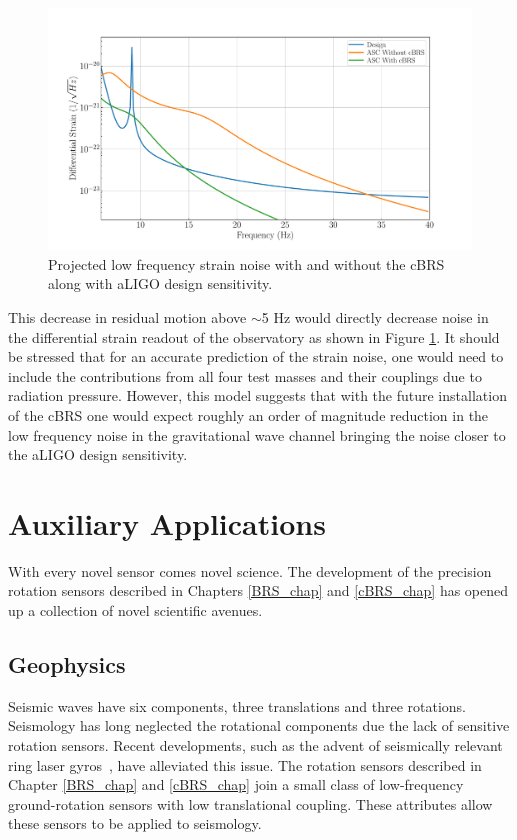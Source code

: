 \documentclass [12pt, proquest]{uwthesis}[2019]
\begin{document}
\begin{figure}[!h]
\begin{center}
\includegraphics[width=\textwidth]{cBRS_ASC.pdf}
\caption[Projected low frequency strain noise with and without the cBRS]{Projected low frequency strain noise with and without the cBRS along with aLIGO design sensitivity. \cite{aLIGO} }
\label{ascStrain}
\end{center}
\end{figure}

This decrease in residual motion above $\sim$5 Hz would directly decrease noise in the differential strain readout of the observatory as shown in Figure \ref{ascStrain}. It should be stressed that for an accurate prediction of the strain noise, one would need to include the contributions from all four test masses and their couplings due to radiation pressure. However, this model suggests that with the future installation of the cBRS one would expect roughly an order of magnitude reduction in the low frequency noise in the gravitational wave channel bringing the noise closer to the aLIGO design sensitivity.


\chapter{Auxiliary Applications}
\quad With every novel sensor comes novel science. The development of the precision rotation sensors described in Chapters \ref{BRS_chap} and \ref{cBRS_chap} has opened up a collection of novel scientific avenues.

\section{Geophysics}
Seismic waves have six components, three translations and three rotations. Seismology has long neglected the rotational components due the lack of sensitive rotation sensors. Recent developments, such as the advent of seismically relevant ring laser gyros~\cite{ring}, have alleviated this issue. The rotation sensors described in Chapter \ref{BRS_chap} and \ref{cBRS_chap} join a small class of low-frequency ground-rotation sensors with low translational coupling. These attributes allow these sensors to be applied to seismology.
\end{document}
